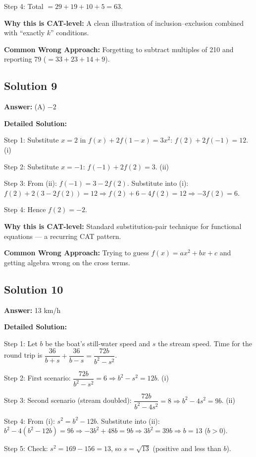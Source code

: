 \documentclass[11pt]{article}
\begin{document}
Step 4: Total \(= 29 + 19 + 10 + 5 = 63\).

\textbf{Why this is CAT-level:} A clean illustration of inclusion–exclusion combined with ``exactly \(k\)'' conditions.

\textbf{Common Wrong Approach:} Forgetting to subtract multiples of 210 and reporting 79 (\(=33+23+14+9\)).

\subsection*{Solution 9}
\textbf{Answer:} (A) \(-2\)

\textbf{Detailed Solution:}

Step 1: Substitute \(x = 2\) in \(f(x) + 2f(1-x) = 3x^{2}\):
\(f(2) + 2f(-1) = 12\). \quad (i)

Step 2: Substitute \(x = -1\):
\(f(-1) + 2f(2) = 3\). \quad (ii)

Step 3: From (ii): \(f(-1) = 3 - 2f(2)\). Substitute into (i):
\(f(2) + 2(3 - 2f(2)) = 12 \Rightarrow f(2) + 6 - 4f(2) = 12 \Rightarrow -3f(2) = 6\).

Step 4: Hence \(f(2) = -2\).

\textbf{Why this is CAT-level:} Standard substitution-pair technique for functional equations — a recurring CAT pattern.

\textbf{Common Wrong Approach:} Trying to guess \(f(x) = ax^{2} + bx + c\) and getting algebra wrong on the cross terms.

\subsection*{Solution 10}
\textbf{Answer:} 13 km/h

\textbf{Detailed Solution:}

Step 1: Let \(b\) be the boat's still-water speed and \(s\) the stream speed. Time for the round trip is \(\dfrac{36}{b+s} + \dfrac{36}{b-s} = \dfrac{72b}{b^{2}-s^{2}}\).

Step 2: First scenario: \(\dfrac{72b}{b^{2}-s^{2}} = 6 \Rightarrow b^{2}-s^{2} = 12b\). \quad (i)

Step 3: Second scenario (stream doubled): \(\dfrac{72b}{b^{2}-4s^{2}} = 8 \Rightarrow b^{2}-4s^{2} = 9b\). \quad (ii)

Step 4: From (i): \(s^{2} = b^{2}-12b\). Substitute into (ii):
\(b^{2} - 4(b^{2}-12b) = 9b \Rightarrow -3b^{2} + 48b = 9b \Rightarrow 3b^{2} = 39b \Rightarrow b = 13\) (\(b>0\)).

Step 5: Check: \(s^{2} = 169 - 156 = 13\), so \(s = \sqrt{13}\) (positive and less than \(b\)).
\end{document}
